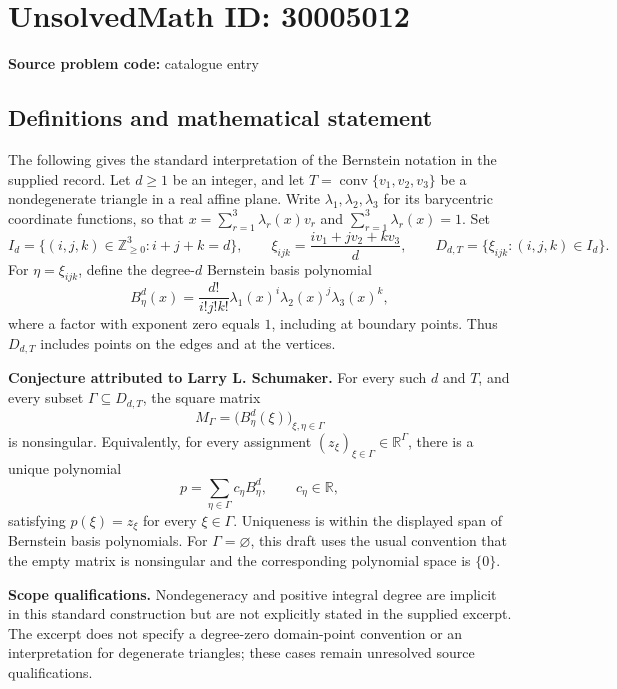 \documentclass[11pt]{article}
\newcommand{\Z}{\mathbb{Z}}
\newcommand{\R}{\mathbb{R}}
\begin{document}
\section*{UnsolvedMath ID: 30005012}
\textbf{Source problem code:} catalogue entry
\subsection{Definitions and mathematical statement}
The following gives the standard interpretation of the Bernstein notation in the supplied record. Let \(d\geq 1\) be an integer, and let \(T=\operatorname{conv}\{v_1,v_2,v_3\}\) be a nondegenerate triangle in a real affine plane. Write \(\lambda_1,\lambda_2,\lambda_3\) for its barycentric coordinate functions, so that \(x=\sum_{r=1}^3\lambda_r(x)v_r\) and \(\sum_{r=1}^3\lambda_r(x)=1\). Set
\[
I_d=\{(i,j,k)\in\Z_{\geq0}^3:i+j+k=d\},\qquad
\xi_{ijk}=\frac{i v_1+j v_2+k v_3}{d},\qquad
D_{d,T}=\{\xi_{ijk}:(i,j,k)\in I_d\}.
\]
For \(\eta=\xi_{ijk}\), define the degree-\(d\) Bernstein basis polynomial
\[
B_\eta^d(x)=\frac{d!}{i!j!k!}\lambda_1(x)^i\lambda_2(x)^j\lambda_3(x)^k,
\]
where a factor with exponent zero equals \(1\), including at boundary points. Thus \(D_{d,T}\) includes points on the edges and at the vertices.

\textbf{Conjecture attributed to Larry L. Schumaker.} For every such \(d\) and \(T\), and every subset \(\Gamma\subseteq D_{d,T}\), the square matrix
\[
M_\Gamma=\bigl(B_\eta^d(\xi)\bigr)_{\xi,\eta\in\Gamma}
\]
is nonsingular. Equivalently, for every assignment \((z_\xi)_{\xi\in\Gamma}\in\R^\Gamma\), there is a unique polynomial
\[
p=\sum_{\eta\in\Gamma}c_\eta B_\eta^d,\qquad c_\eta\in\R,
\]
satisfying \(p(\xi)=z_\xi\) for every \(\xi\in\Gamma\). Uniqueness is within the displayed span of Bernstein basis polynomials. For \(\Gamma=\varnothing\), this draft uses the usual convention that the empty matrix is nonsingular and the corresponding polynomial space is \(\{0\}\).

\textbf{Scope qualifications.} Nondegeneracy and positive integral degree are implicit in this standard construction but are not explicitly stated in the supplied excerpt. The excerpt does not specify a degree-zero domain-point convention or an interpretation for degenerate triangles; these cases remain unresolved source qualifications.
\end{document}
